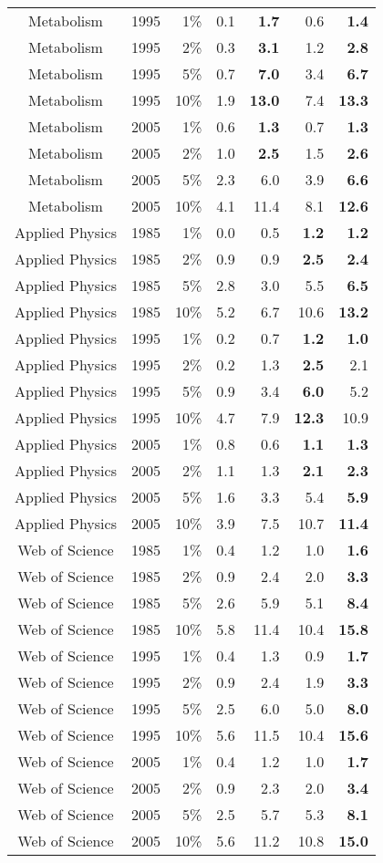 \documentclass{article}
\begin{document}
\begin{table}
\begin{centering}
{\begin{tabular}{ccrrrrr}
Metabolism & 1995&1\%& 0.1& \bf{1.7}& 0.6& \bf{1.4} \\ 
Metabolism & 1995&2\%& 0.3& \bf{3.1}& 1.2& \bf{2.8} \\ 
Metabolism & 1995&5\%& 0.7& \bf{7.}0& 3.4& \bf{6.7} \\ 
Metabolism & 1995&10\%& 1.9& \bf{13.0}& 7.4& \bf{13.3} \\ 
Metabolism & 2005&1\%& 0.6& \bf{1.3}& 0.7& \bf{1.3} \\ 
Metabolism & 2005&2\%& 1.0& \bf{2.5}& 1.5& \bf{2.6} \\ 
Metabolism & 2005&5\%& 2.3& 6.0& 3.9& \bf{6.6} \\ 
Metabolism & 2005&10\%& 4.1& 11.4& 8.1& \bf{12.6} \\ 
Applied Physics & 1985&1\%& 0.0& 0.5& \bf{1.2}& \bf{1.2} \\ 
Applied Physics & 1985&2\%& 0.9& 0.9& \bf{2.5}& \bf{2.4} \\ 
Applied Physics & 1985&5\%& 2.8& 3.0& 5.5& \bf{6.5} \\ 
Applied Physics & 1985&10\%& 5.2& 6.7& 10.6& \bf{13.2} \\ 
Applied Physics & 1995&1\%& 0.2& 0.7& \bf{1.2}& \bf{1.0} \\ 
Applied Physics & 1995&2\%& 0.2& 1.3& \bf{2.5}& 2.1 \\ 
Applied Physics & 1995&5\%& 0.9& 3.4& \bf{6.0}& 5.2 \\ 
Applied Physics & 1995&10\%& 4.7& 7.9& \bf{12.3}& 10.9 \\ 
Applied Physics & 2005&1\%& 0.8& 0.6& \bf{1.1}& \bf{1.3} \\ 
Applied Physics & 2005&2\%& 1.1& 1.3& \bf{2.1}& \bf{2.3}\\ 
Applied Physics & 2005&5\%& 1.6& 3.3& 5.4& \bf{5.9} \\ 
Applied Physics & 2005&10\%& 3.9& 7.5& 10.7& \bf{11.4} \\ 
Web of Science & 1985&1\%& 0.4& 1.2& 1.0& \bf{1.6} \\ 
Web of Science & 1985&2\%& 0.9& 2.4& 2.0& \bf{3.3} \\ 
Web of Science & 1985&5\%& 2.6& 5.9& 5.1& \bf{8.4} \\ 
Web of Science & 1985&10\%& 5.8& 11.4& 10.4& \bf{15.8} \\ 
Web of Science & 1995&1\%& 0.4& 1.3& 0.9& \bf{1.7} \\ 
Web of Science & 1995&2\%& 0.9& 2.4& 1.9& \bf{3.3} \\ 
Web of Science & 1995&5\%& 2.5& 6.0& 5.0& \bf{8.0} \\ 
Web of Science & 1995&10\%& 5.6& 11.5& 10.4& \bf{15.6} \\ 
Web of Science & 2005&1\%& 0.4& 1.2& 1.0& \bf{1.7} \\ 
Web of Science & 2005&2\%& 0.9& 2.3& 2.0& \bf{3.4} \\ 
Web of Science & 2005&5\%& 2.5& 5.7& 5.3& \bf{8.1} \\ 
Web of Science & 2005&10\%& 5.6& 11.2& 10.8& \bf{15.0} \\
\hline
\end{tabular}}
\end{centering}
\end{table}
\end{document}
